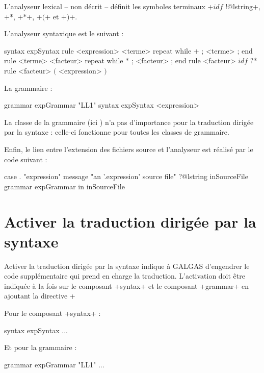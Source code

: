 L'analyseur lexical -- non décrit -- définit les symboles terminaux \ggst+$idf$ !@lstring+, \ggst*$+$*, \ggst+$*$+, \ggst+$($+ et \ggst+$)$+.

L'analyseur syntaxique est le suivant :
\begin{galgas3}
syntax expSyntax {
  rule <expression> {
    <terme>
    repeat while $+$ ; <terme> ; end
  }
  rule <terme> {
    <facteur>
    repeat while $*$ ; <facteur> ; end
  }
  rule <facteur> {
    $idf$ ?*
  }
  rule <facteur> {
    $($
    <expression>
    $)$
  }
}
\end{galgas3}

La grammaire :
\begin{galgas3}
grammar expGrammar "LL1" {
  syntax expSyntax
  <expression>
}
\end{galgas3}

La classe de la grammaire (ici ) n'a pas d'importance pour la traduction dirigée par la syntaxe : celle-ci fonctionne pour toutes les classes de grammaire.

Enfin, le lien entre l'extension des fichiers source et l'analyseur est réalisé par le code suivant :
\begin{galgas3}
case . "expression"
message "an '.expression' source file"
?@lstring inSourceFile {
  grammar expGrammar in inSourceFile
}
\end{galgas3}








\section{Activer la traduction dirigée par la syntaxe}

Activer la traduction dirigée par la syntaxe indique à GALGAS d'engendrer le code supplémentaire qui prend en charge la traduction. L'activation doit être indiquée à la fois sur le composant \ggst+syntax+ et le composant \ggst+grammar+ en ajoutant la directive \ggst+%

Pour le composant \ggst+syntax+ :
\begin{galgas3}
syntax expSyntax %
  ...
\end{galgas3}

Et pour la grammaire :
\begin{galgas3}
grammar expGrammar "LL1" %
  ...
\end{galgas3}

